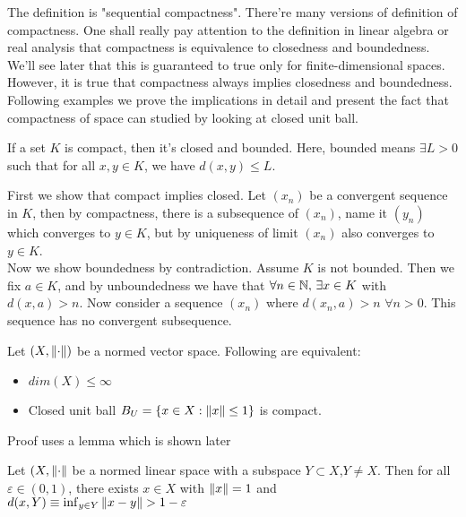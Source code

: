 \documentclass{article}
\begin{document}
\begin{remark}\rm\nextline
	The definition is "sequential compactness". There're many versions of definition of compactness. One shall really pay attention to the definition in linear algebra or real analysis that compactness is equivalence to closedness and boundedness. We'll see later that this is guaranteed to true only for finite-dimensional spaces. However, it is true that compactness always implies closedness and boundedness. Following examples we prove the implications in detail and present the fact that compactness of space can studied by looking at closed unit ball.
\end{remark}


\begin{proposition}\rm\nextline
	If a set $K$ is compact, then it's closed and bounded. Here, bounded means $\exists L>0$ such that for all $x,y\in K$, we have $d(x,y)\leq L$.\\
	\begin{pf}{}{}
		First we show that compact implies closed. Let $(x_n)$ be a convergent sequence in $K$, then by compactness, there is a subsequence of $(x_n)$, name it $(y_n)$ which converges to $y\in K$, but by uniqueness of limit $(x_n)$ also converges to $y\in K$.\\
		Now we show boundedness by contradiction. Assume $K$ is not bounded. Then we fix $a\in K$, and by unboundedness we have that $\forall n\in \mathbb{N},\,\exists x\in K$ with $d(x,a)>n$. Now consider a sequence $(x_n)$ where  $d(x_n,a)>n$ $\forall n>0$. This sequence has no convergent subsequence.
	\end{pf}
\end{proposition}


\begin{theorem}[F.Riesz]\label{compact unit balls}\rm\nextline
	Let $(X,\left\|{\cdot}\right\|)$ be a normed vector space. Following are equivalent:
	\begin{itemize}
		\item $dim(X)\leq\infty$
		\item Closed unit ball $B_U=\{x\in X:\left\|{x}\right\|\leq 1\}$ is compact.
	\end{itemize}
	\prf Proof uses a lemma which is shown later\placeholder
\end{theorem}

\begin{lemma}[F.Riesz]\rm\nextline
	Let $(X,\left\|{\cdot}\right\|$ be a normed linear space with a subspace $Y\subset X$,$Y\neq X$.
	Then for all $\varepsilon\in(0,1)$, there exists $x\in X$ with $\left\|{x}\right\|=1$ and $d(x,Y)\equiv\inf_{y\in Y} \norm{x-y}>1-\varepsilon$
	\prf \placeholder
\end{lemma}
\end{document}
